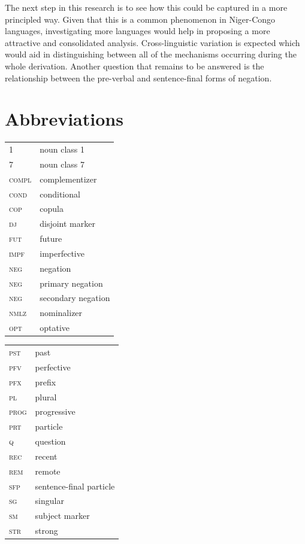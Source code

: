\documentclass[output=paper,colorlinks,citecolor=brown,
]{langscibook}
\begin{document}
The next step in this research is to see how this could be captured in a more principled way. Given that this is a common phenomenon in Niger-Congo languages, investigating more languages would help in proposing a more attractive and consolidated analysis. Cross-linguistic variation is expected which would aid in distinguishing between all of the mechanisms occurring during the whole derivation. Another question that remains to be answered is the relationship between the pre-verbal and sentence-final forms of negation.







\section*{Abbreviations}
\label{tab:chaperon:abbrv}

\begin{tabularx}{.45\textwidth}{lQ}
    1 & noun class 1 \\ 
    7 & noun class 7 \\ 
		 \textsc{compl} & complementizer \\
         \textsc{cond} & conditional \\ 
        \textsc{cop} & copula \\
        \textsc{dj} & disjoint marker \\
        \textsc{fut} & future \\
        \textsc{impf} & imperfective \\ 
        \textsc{neg} & negation \\
        \textsc{neg} & primary negation \\
        \textsc{neg} & secondary negation \\
        \textsc{nmlz} & nominalizer \\
        \textsc{opt} & optative \\ 
        \end{tabularx}
\begin{tabularx}{.45\textwidth}{lQ}
        \textsc{pst} & past \\
        \textsc{pfv} & perfective \\ 
        \textsc{pfx} & prefix \\
        \textsc{pl} & plural \\ 
        \textsc{prog} & progressive \\
        \textsc{prt} & particle \\
        \textsc{q} & question \\
        \textsc{rec} & recent \\ 
        \textsc{rem} & remote \\
        \textsc{sfp} & sentence-final particle \\ 
        \textsc{sg} & singular \\
        \textsc{sm} & subject marker \\ 
        \textsc{str} & strong
\end{tabularx}
\end{document}
